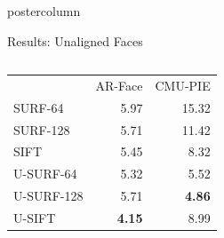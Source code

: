 \documentclass[final,hyperref={pdfpagelabels=false}]{beamer}
\begin{document}
\begin{frame}
\begin{columns}
\begin{column}{.49\textwidth}
\begin{beamercolorbox}[center,wd=\textwidth]{postercolumn}
\begin{minipage}[T]{.95\textwidth}
{\begin{block}{Results: Unaligned Faces}
\begin{columns}
\begin{column}{.59\textwidth}
\begin{table}
\begin{tabular}{@{} p{.4\linewidth} r r @{}}
                      \cmidrule(l){2-3}   
                      &   AR-Face       & CMU-PIE  \\
                      \cmidrule(r){1-1}  \cmidrule(lr){2-2}  \cmidrule(l){3-3}  
                      SURF-64     &   5.97          & 15.32    \\ 
                      SURF-128    &   5.71          & 11.42    \\ 
                      SIFT        &   5.45          & 8.32     \\  
                      \addlinespace
                      U-SURF-64   &   5.32          & 5.52     \\  
                      U-SURF-128  &   5.71          & \textbf{4.86}  \\ 
                      U-SIFT      &   \textbf{4.15} & 8.99     \\  
                      \bottomrule
                    \end{tabular}
                  \end{table}
                \end{column}
\end{columns}
\end{block}}
\end{minipage}
\end{beamercolorbox}
\end{column}
\end{columns}
\end{frame}
\end{document}

